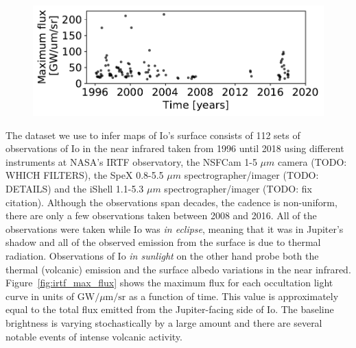 \documentclass[modern]{aastex62}
\begin{document}
\begin{figure}[h!]
    \begin{centering}
    \includegraphics[width=\linewidth]{figures/irtf_max_flux.pdf}
    \end{centering}
\end{figure}

The dataset we use to infer maps of Io's surface consists of 112 sets of observations of Io in the near infrared taken from 1996 until 2018 using different instruments at NASA's IRTF observatory, the NSFCam  1-5 $\mu m$ camera \citep{shure1994} (TODO: WHICH FILTERS), the SpeX 0.8-5.5 $\mu m$ spectrographer/imager \citep{rayner2003} (TODO: DETAILS) and the iShell 1.1-5.3 $\mu m$  spectrographer/imager \citep{johnrayner2016} (TODO: fix citation).
Although the observations span decades, the cadence is non-uniform, there are only a few observations taken between 2008 and 2016.
All of the observations were taken while Io was \emph{in eclipse}, meaning that it was in Jupiter's shadow and all of the observed emission from the surface is due to thermal radiation.
Observations of Io \emph{in sunlight} on the other hand probe both the thermal (volcanic) emission and the surface albedo variations in the near infrared.
Figure~\ref{fig:irtf_max_flux} shows the maximum flux for each occultation light curve in units of $\mathrm{GW}/\mu \mathrm{m}/\mathrm{sr}$ as a function of time.
This value is approximately equal to the total flux emitted from the Jupiter-facing side of Io.
The baseline brightness is varying stochastically by a large amount and there are several notable events of intense volcanic activity.
\end{document}
